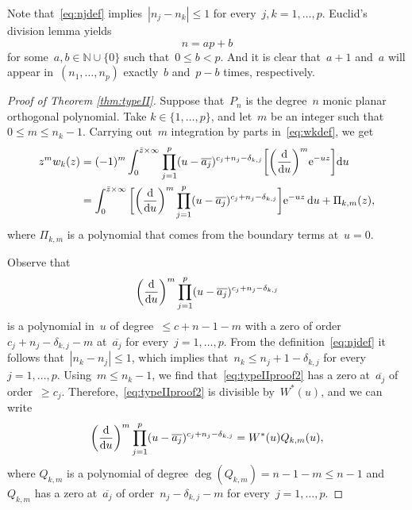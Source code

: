 \documentclass[pdftex]{sigma}
\numberwithin{equation}{section}
\newcommand*{\Nset}{\mathbb{N}} %
\begin{document}
 Note that~\eqref{eq:njdef} implies~$|n_j-n_k| \leq 1$ for every~$j,k=1, \dots, p$. Euclid's division lemma yields
 \begin{equation*}
 n = ap + b
 \end{equation*}
 for some~$a,b \in \Nset \cup \{ 0\}$ such that~$0 \leq b < p$. And it is clear that~$a+1$ and~$a$ will appear in~$(n_1, \dots, n_p)$ exactly~$b$ and~$p-b$ times, respectively.

 \begin{proof}[Proof of Theorem \ref{thm:typeII}]
 Suppose that~$P_n$ is the degree~$n$ monic planar orthogonal polynomial. Take $k \in \{1, \dots, p\}$, and let~$m$ be an integer such that~$0 \leq m \leq n_k-1$. Carrying out~$m$ integration by parts in~\eqref{eq:wkdef}, we get{\samepage
 \begin{align}
 z^m w_k(z) & = (-1)^m \int_0^{\bar{z} \times \infty} \prod_{j=1}^p (u-\overline{a_j})^{c_j + n_j-\delta_{k,j}} \bigg[ \bigg(\frac{\rm d}{{\rm d}u}\bigg)^m {\rm e}^{-uz} \bigg] {\rm d}u \nonumber
 \\
 & = \int_0^{\bar{z} \times \infty} \bigg[ \bigg(\frac{\rm d}{{\rm d}u}\bigg)^m \prod_{j=1}^p (u-\overline{a_j})^{c_j + n_j-\delta_{k,j}} \bigg] {\rm e}^{-uz} \, {\rm d}u + \Pi_{k,m}(z),
 \label{eq:typeIIproof1}
 \end{align}
 where $\Pi_{k,m}$ is a polynomial that comes from the boundary terms at~$u=0$.}

 Observe that
 \begin{equation}
 \label{eq:typeIIproof2}
 \bigg(\frac{\rm d}{{\rm d}u}\bigg)^m \prod_{j=1}^p (u-\overline{a_j})^{c_j + n_j-\delta_{k,j}}
 \end{equation}
 is a polynomial in~$u$ of degree~$\leq c+n-1-m$ with a zero of order~$c_j+n_j - \delta_{k,j} - m$ at~$\overline{a_j}$ for every~$j=1, \dots, p$. From the definition~\eqref{eq:njdef} it follows that~$|n_k - n_j| \leq 1$, which implies that~$n_k \leq n_j + 1 - \delta_{k,j}$ for every~$j=1, \dots, p$. Using~$m \leq n_k-1$, we find that~\eqref{eq:typeIIproof2} has a zero at~$\overline{a_j}$ of order~$\geq c_j$. Therefore,~\eqref{eq:typeIIproof2} is divisible by~$W^*(u)$, and we can write
 \begin{equation}
 \label{eq:typeIIproof3}
 \bigg(\frac{\rm d}{{\rm d}u}\bigg)^m \prod_{j=1}^p (u-\overline{a_j})^{c_j + n_j-\delta_{k,j}} = W^*(u) Q_{k,m}(u),
 \end{equation}
 where $Q_{k,m}$ is a polynomial of degree
$\deg(Q_{k,m}) = n-1-m \leq n-1$
 and~$Q_{k,m}$ has a zero at~$\overline{a_j}$ of order~$n_j - \delta_{k,j}-m$ for every~$j=1, \dots, p$.


\end{proof}
\end{document}
